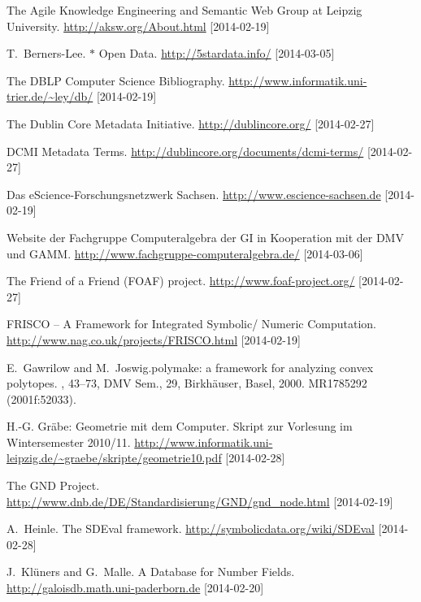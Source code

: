 \documentclass[a4paper,11pt]{article}
\begin{document}
\begin{multicols}{2}
\begin{thebibliography}{1}
 The Agile Knowledge Engineering and Semantic Web Group at
  Leipzig University. \newblock \url{http://aksw.org/About.html} [2014-02-19]

 T.\ Berners-Lee.  $\ast$ Open Data. \newblock
  \url{http://5stardata.info/} [2014-03-05]

 The DBLP Computer Science Bibliography. \newblock
  \url{http://www.informatik.uni-trier.de/~ley/db/} [2014-02-19]

 The Dublin Core Metadata Initiative.  \newblock
  \url{http://dublincore.org/} [2014-02-27]

 DCMI Metadata Terms.  \newblock
  \url{http://dublincore.org/documents/dcmi-terms/} [2014-02-27]

 Das eScience-Forschungsnetzwerk Sachsen.
  \newblock \url{http://www.escience-sachsen.de} [2014-02-19]

 Website der Fachgruppe Computeralgebra der GI in Kooperation mit
  der DMV und GAMM.  \newblock \url{http://www.fachgruppe-computeralgebra.de/}
  [2014-03-06]

 The Friend of a Friend (FOAF) project.  \newblock
  \url{http://www.foaf-project.org/} [2014-02-27]

 FRISCO -- A Framework for Integrated Symbolic/ Numeric
  Computation. \newblock \url{http://www.nag.co.uk/projects/FRISCO.html}
  [2014-02-19]

 E.\ Gawrilow and M.\ Joswig.\newblock polymake: a framework
  for analyzing convex polytopes. , 43–73, DMV Sem., 29, Birkhäuser, Basel,
  2000. MR1785292 (2001f:52033).

 H.-G. Gr\"abe: Geometrie mit dem Computer.  Skript zur
  Vorlesung im Wintersemester 2010/11. \newblock
  \url{http://www.informatik.uni-leipzig.de/~graebe/skripte/geometrie10.pdf}
      [2014-02-28]

 The GND Project. \newblock
  \url{http://www.dnb.de/DE/Standardisierung/GND/gnd_node.html} [2014-02-19]

 A.\ Heinle. The SDEval framework.  \newblock
  \url{http://symbolicdata.org/wiki/SDEval} [2014-02-28]

 J.\ Klüners and G.\ Malle.  \newblock A Database for
  Number Fields. \newblock \url{http://galoisdb.math.uni-paderborn.de}
  [2014-02-20]


\end{thebibliography}
\end{multicols}
\end{document}
